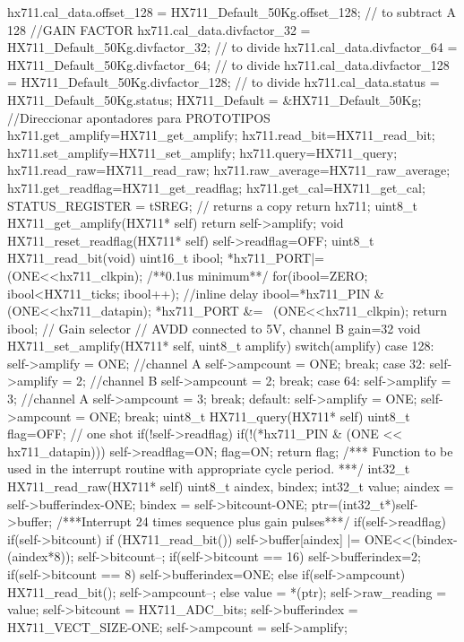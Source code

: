 \begin{verbatimtab}
{	hx711.cal_data.offset_128 = HX711_Default_50Kg.offset_128; // to subtract A 128
	//GAIN FACTOR
	hx711.cal_data.divfactor_32 = HX711_Default_50Kg.divfactor_32; // to divide
	hx711.cal_data.divfactor_64 = HX711_Default_50Kg.divfactor_64; // to divide
	hx711.cal_data.divfactor_128 = HX711_Default_50Kg.divfactor_128; // to divide
	hx711.cal_data.status = HX711_Default_50Kg.status;
	HX711_Default = &HX711_Default_50Kg;
	//Direccionar apontadores para PROTOTIPOS
	hx711.get_amplify=HX711_get_amplify;
	hx711.read_bit=HX711_read_bit;
	hx711.set_amplify=HX711_set_amplify;
	hx711.query=HX711_query;
	hx711.read_raw=HX711_read_raw;
	hx711.raw_average=HX711_raw_average;
	hx711.get_readflag=HX711_get_readflag;
	hx711.get_cal=HX711_get_cal;
	STATUS_REGISTER = tSREG;
	// returns a copy
	return hx711;
}
uint8_t HX711_get_amplify(HX711* self)
{
	return self->amplify;
}
void HX711_reset_readflag(HX711* self)
{
	self->readflag=OFF;
}
uint8_t HX711_read_bit(void)
{	
	uint16_t ibool;
	*hx711_PORT|=(ONE<<hx711_clkpin);
	/**0.1us minimum**/
	for(ibool=ZERO; ibool<HX711_ticks; ibool++); //inline delay
	ibool=*hx711_PIN & (ONE<<hx711_datapin);
	*hx711_PORT &= ~(ONE<<hx711_clkpin);
	return ibool;
}
// Gain selector
// AVDD connected to 5V, channel B gain=32
void HX711_set_amplify(HX711* self, uint8_t amplify)
{
	switch(amplify){
		case 128:
		self->amplify = ONE; //channel A
		self->ampcount = ONE;
		break;
		case 32:
		self->amplify = 2; //channel B
		self->ampcount = 2; 
		break;
		case 64:
		self->amplify = 3; //channel A
		self->ampcount = 3;
		break;
		default:
		self->amplify = ONE;
		self->ampcount = ONE;
		break;
	}
}
uint8_t HX711_query(HX711* self)
{
	uint8_t flag=OFF; // one shot
	if(!self->readflag){
		if(!(*hx711_PIN & (ONE << hx711_datapin))){
			self->readflag=ON;
			flag=ON;
		}
	}
	return flag;
}
/***
Function to be used in the interrupt routine with appropriate cycle period.
***/
int32_t HX711_read_raw(HX711* self)
{
	uint8_t aindex, bindex;
	int32_t value;
	aindex = self->bufferindex-ONE;
	bindex = self->bitcount-ONE;
	ptr=(int32_t*)self->buffer;
	/***Interrupt 24 times sequence plus gain pulses***/
	if(self->readflag){
		if(self->bitcount){
			if (HX711_read_bit())
			self->buffer[aindex] |= ONE<<(bindex-(aindex*8));
			self->bitcount--;
			if(self->bitcount == 16)
			self->bufferindex=2;
			if(self->bitcount == 8)
			self->bufferindex=ONE;
		}else{
			if(self->ampcount){
				HX711_read_bit();
				self->ampcount--;
			}else{
				value = *(ptr);
				self->raw_reading = value;
				self->bitcount = HX711_ADC_bits;
				self->bufferindex = HX711_VECT_SIZE-ONE;
				self->ampcount = self->amplify;
}}}}
\end{verbatimtab}
